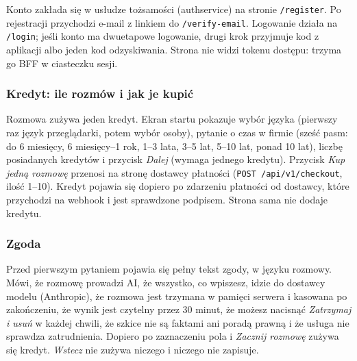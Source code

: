{Konto zakłada się w usłudze tożsamości (authservice) na stronie
\texttt{/register}. Po rejestracji przychodzi e-mail z linkiem do
\texttt{/verify-email}. Logowanie działa na \texttt{/login}; jeśli konto ma
dwuetapowe logowanie, drugi krok przyjmuje kod z aplikacji albo jeden kod
odzyskiwania. Strona nie widzi tokenu dostępu: trzyma go BFF w ciasteczku sesji.


\subsubsection{Kredyt: ile rozmów i jak je kupić}

Rozmowa zużywa jeden kredyt. Ekran startu pokazuje wybór języka (pierwszy raz
język przeglądarki, potem wybór osoby), pytanie o czas w firmie (sześć pasm:
do 6 miesięcy, 6 miesięcy--1 rok, 1--3 lata, 3--5 lat, 5--10 lat, ponad 10 lat),
liczbę posiadanych kredytów i przycisk \emph{Dalej} (wymaga jednego kredytu).
Przycisk \emph{Kup jedną rozmowę} przenosi na stronę dostawcy płatności
(\texttt{POST /api/v1/checkout}, ilość 1--10). Kredyt pojawia się dopiero po
zdarzeniu płatności od dostawcy, które przychodzi na webhook i jest sprawdzone
podpisem. Strona sama nie dodaje kredytu.


\subsubsection{Zgoda}

Przed pierwszym pytaniem pojawia się pełny tekst zgody, w języku rozmowy. Mówi,
że rozmowę prowadzi AI, że wszystko, co wpiszesz, idzie do dostawcy modelu
(Anthropic), że rozmowa jest trzymana w pamięci serwera i kasowana po zakończeniu,
że wynik jest czytelny przez 30 minut, że możesz nacisnąć \emph{Zatrzymaj i usuń}
w każdej chwili, że szkice nie są faktami ani poradą prawną i że usługa nie
sprawdza zatrudnienia. Dopiero po zaznaczeniu pola i \emph{Zacznij rozmowę}
zużywa się kredyt. \emph{Wstecz} nie zużywa niczego i niczego nie zapisuje.

}
